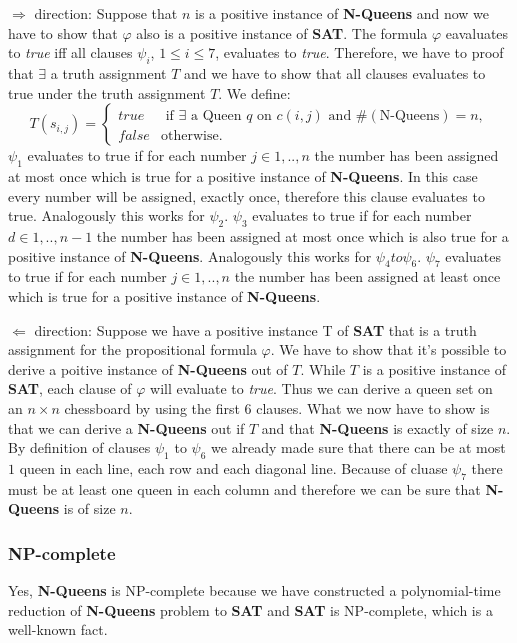 $\Rightarrow $ direction:\newline
Suppose that $n$ is a positive instance of \textbf{N-Queens} and now we have
to show that $\varphi $ also is a positive instance of \textbf{SAT}.\newline
The formula $\varphi $ eavaluates to \textit{true} iff all clauses $\psi _{i}
$, $1\leq i\leq 7$, evaluates to \textit{true}. Therefore, we have to proof
that $\exists $ a truth assignment $T$ and we have to show that all clauses
evaluates to true under the truth assignment $T$. We define:\newline
\begin{equation*}
T(s_{i,j})=\left\{ 
\begin{array}{cl}
true & \text{ if }\exists \text{ a Queen }q\text{ on }c(i,j)\text{ and }%
\#(\text{N-Queens})=n, \\ 
false & \text{otherwise.}%
\end{array}%
\right. 
\end{equation*}%
$\psi _{1}$ evaluates to true if for each number $j\in {1,..,n}$ the number
has been assigned at most once which is true for a positive instance of 
\textbf{N-Queens}. In this case every number will be assigned, exactly once,
therefore this clause evaluates to true.\newline
Analogously this works for $\psi _{2}$.\newline
$\psi _{3}$ evaluates to true if for each number $d\in {1,..,n-1}$ the
number has been assigned at most once which is also true for a positive
instance of \textbf{N-Queens}.\newline
Analogously this works for $\psi _{4}to\psi _{6}$.\newline
$\psi _{7}$ evaluates to true if for each number $j\in {1,..,n}$ the number
has been assigned at least once which is true for a positive instance of 
\textbf{N-Queens}.\newline

\noindent $\Leftarrow $ direction:\newline
Suppose we have a positive instance T of \textbf{SAT} that is a truth
assignment for the propositional formula $\varphi $. We have to show that
it's possible to derive a poitive instance of \textbf{N-Queens} out of $T$.%
\newline
While $T$ is a positive instance of \textbf{SAT}, each clause of $\varphi $
will evaluate to \textit{true}. Thus we can derive a queen set on an $%
n\times n$ chessboard by using the first 6 clauses. What we now have to show
is that we can derive a \textbf{N-Queens} out if $T$ and that \textbf{%
N-Queens} is exactly of size $n$.\newline
By definition of clauses $\psi _{1}$ to $\psi _{6}$ we already made sure
that there can be at most $1$ queen in each line, each row and each diagonal
line. Because of cluase $\psi _{7}$ there must be at least one queen in each
column and therefore we can be sure that \textbf{N-Queens} is of size $n$.

\subsubsection{NP-complete}

Yes, \textbf{N-Queens} is NP-complete because we have constructed a
polynomial-time reduction of \textbf{N-Queens} problem to \textbf{SAT} and 
\textbf{SAT} is NP-complete, which is a well-known fact.

\bigskip
